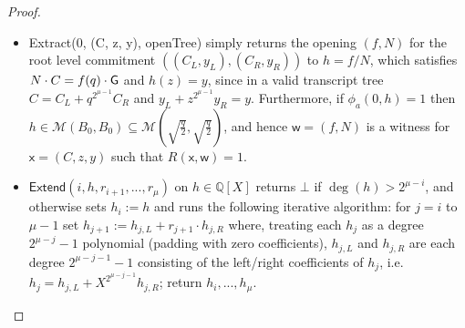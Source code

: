 \begin{proof}
\begin{itemize}


\item \textsf{Extract}(0, (C, z, y), \textsf{openTree}) simply returns the opening $(f, N)$ for the root level commitment $((C_L, y_L), (C_R, y_R))$ to $h = f/N$, which satisfies $N \cdot C = f(q) \cdot \mathsf{G}$ and $h(z) = y$, since in a valid transcript tree $C = C_L + q^{2^{\mu -1}} C_R$ and $y_L + z^{2^{\mu -1}} y_R = y$.  Furthermore, if $\phi_a(0, h) = 1$ then $h \in \mathcal{M}(B_0, B_0) \subseteq \mathcal{M}(\sqrt{\frac{q}{2}}, \sqrt{\frac{q}{2}})$, and hence $\mathsf{w} = (f, N)$ is a witness for $\mathsf{x} = (C, z, y)$ such that $R(\mathsf{x}, \mathsf{w}) = 1$. 



\item $\textsf{Extend}(i, h, r_{i+1},...,r_\mu)$ on $h \in \mathbb{Q}[X]$ returns $\bot$ if $\deg(h) > 2^{\mu - i}$, and otherwise sets $h_i := h$ and runs the following iterative algorithm: for $j = i$ to $\mu-1$ set $h_{j+1} := h_{j, L} + r_{j+1} \cdot h_{j,R}$ where, treating each $h_j$ as a degree $2^{\mu - j} -1$ polynomial (padding with zero coefficients), $h_{j,L}$ and $h_{j, R}$ are each degree $2^{\mu -j - 1} - 1$ consisting of the left/right coefficients of $h_j$, i.e. $h_j = h_{j,L} + X^{2^{\mu - j - 1}} h_{j,R}$; return $h_i,...,h_\mu$. 


\end{itemize}
\end{proof}
